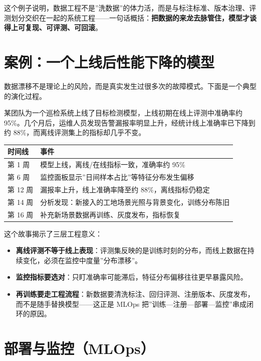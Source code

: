 \documentclass[12pt,a4paper,twoside,openany]{ctexbook}
\numberwithin{figure}{chapter}
\numberwithin{table}{chapter}
\providecommand{\tightlist}{\setlength{\itemsep}{0pt}\setlength{\parskip}{0pt}}
\newcounter{none}
\begin{document}
这个例子说明，数据工程不是''洗数据''的体力活，而是与标注标准、版本治理、评测划分交织在一起的系统工程------一句话概括：\textbf{把数据的来龙去脉管住，模型才谈得上可复现、可评测、可回滚}。

\section{案例：一个上线后性能下降的模型}\label{ux6848ux4f8bux4e00ux4e2aux4e0aux7ebfux540eux6027ux80fdux4e0bux964dux7684ux6a21ux578b}

数据漂移不是理论上的风险，而是真实发生过很多次的故障模式。下面是一个典型的演化过程。

某团队为一个巡检系统上线了目标检测模型，上线初期在线上评测中准确率约
95\%。几个月后，运维人员发现告警漏报率明显上升，经统计线上准确率已下降到约
88\%，而离线评测集上的指标却几乎不变。

{\def\LTcaptype{none} %
\begin{longtable}[]{@{}ll@{}}
\toprule\noalign{}
时间线 & 事件 \\
\midrule\noalign{}
\endhead
\bottomrule\noalign{}
\endlastfoot
第 1 周 & 模型上线，离线/在线指标一致，准确率约 95\% \\
第 6 周 & 监控面板显示''日间样本占比''等特征分布发生偏移 \\
第 12 周 & 漏报率上升，线上准确率降至约 88\%，离线指标仍稳定 \\
第 14 周 & 分析发现：新接入的工地场景光照与背景变化，训练分布陈旧 \\
第 16 周 & 补充新场景数据再训练、灰度发布，指标恢复 \\
\end{longtable}
}

这个故事揭示了三层工程意义：

\begin{itemize}
\tightlist
\item
  \textbf{离线评测不等于线上表现}：评测集反映的是训练时刻的分布，而线上数据在持续变化，必须在监控中度量''分布漂移''。
\item
  \textbf{监控指标要选对}：只盯准确率可能滞后，特征分布偏移往往更早暴露风险。
\item
  \textbf{再训练要走工程流程}：新数据要清洗标注、回归评测、注册版本、灰度发布，而不是随手替换模型------这正是
  MLOps 把''训练---注册---部署---监控''串成闭环的原因。
\end{itemize}

\section{部署与监控（MLOps）}\label{ux90e8ux7f72ux4e0eux76d1ux63a7mlops}
\end{document}
